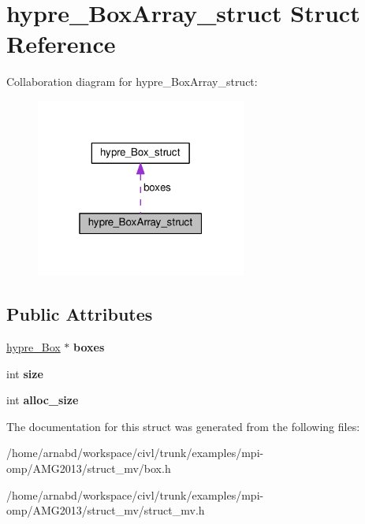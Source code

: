 \hypertarget{structhypre__BoxArray__struct}{}\section{hypre\+\_\+\+Box\+Array\+\_\+struct Struct Reference}
\label{structhypre__BoxArray__struct}


Collaboration diagram for hypre\+\_\+\+Box\+Array\+\_\+struct\+:
\nopagebreak
\begin{figure}[H]
\begin{center}
\leavevmode
\includegraphics[width=196pt]{structhypre__BoxArray__struct__coll__graph}
\end{center}
\end{figure}
\subsection*{Public Attributes}
\begin{DoxyCompactItemize}
\item 
\hypertarget{structhypre__BoxArray__struct_af5227542f72aa71db51857d031e2e347}{}\hyperlink{structhypre__Box__struct}{hypre\+\_\+\+Box} $\ast$ {\bfseries boxes}\label{structhypre__BoxArray__struct_af5227542f72aa71db51857d031e2e347}

\item 
\hypertarget{structhypre__BoxArray__struct_a4cae1977d8186d8c9fecaebaefb32957}{}int {\bfseries size}\label{structhypre__BoxArray__struct_a4cae1977d8186d8c9fecaebaefb32957}

\item 
\hypertarget{structhypre__BoxArray__struct_a8ba1df4e5aa2f470af602422e95ce8da}{}int {\bfseries alloc\+\_\+size}\label{structhypre__BoxArray__struct_a8ba1df4e5aa2f470af602422e95ce8da}

\end{DoxyCompactItemize}


The documentation for this struct was generated from the following files\+:\begin{DoxyCompactItemize}
\item 
/home/arnabd/workspace/civl/trunk/examples/mpi-\/omp/\+A\+M\+G2013/struct\+\_\+mv/box.\+h\item 
/home/arnabd/workspace/civl/trunk/examples/mpi-\/omp/\+A\+M\+G2013/struct\+\_\+mv/struct\+\_\+mv.\+h\end{DoxyCompactItemize}
